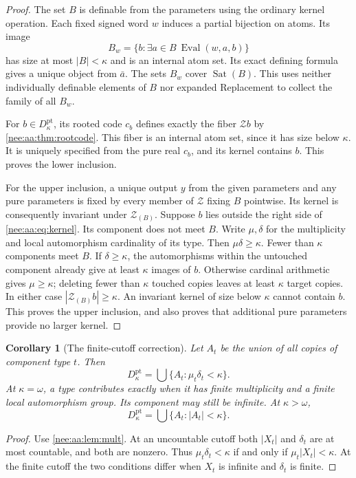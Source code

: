 \documentclass[11pt,letterpaper]{article}
\numberwithin{equation}{section}
\theoremstyle{plain}
\newtheorem{corollary}[corollary]{Corollary}
\theoremstyle{definition}
\theoremstyle{remark}
\newcommand{\Sat}{\operatorname{Sat}}
\newcommand{\Eval}{\operatorname{Eval}}
\newcommand{\srcs}[1]{\par\noindent{\footnotesize\textit{Sources:} #1}\par}
\begin{document}
\begin{proof}
The set $B$ is definable from the parameters using the ordinary kernel operation.
Each fixed signed word $w$ induces a partial bijection on atoms. Its image
\[
B_w=\{b:\exists a\in B\ \Eval(w,a,b)\}
\]
has size at most $|B|<\kappa$ and is an internal atom set. Its exact defining
formula gives a unique object from $\bar a$. The sets $B_w$ cover $\Sat(B)$.
This uses neither individually definable elements of $B$ nor expanded
Replacement to collect the family of all $B_w$.

For $b\in D^{\mathrm{pt}}_\kappa$, its rooted code $c_b$ defines exactly the
fiber $\mathcal Z b$ by \cref{nee:aa:thm:rootcode}. This fiber is an internal atom set,
since it has size below $\kappa$. It is uniquely specified from the pure real
$c_b$, and its kernel contains $b$. This proves the lower inclusion.

For the upper inclusion, a unique output $y$ from the given parameters and any
pure parameters is fixed by every member of $\mathcal Z$ fixing $B$ pointwise.
Its kernel is consequently invariant under $\mathcal Z_{(B)}$.
Suppose $b$ lies outside the right side of \eqref{nee:aa:eq:kernel}. Its component does
not meet $B$. Write $\mu,\delta$ for the multiplicity and local automorphism
cardinality of its type. Then $\mu\delta\geq\kappa$. Fewer than $\kappa$
components meet $B$. If $\delta\geq\kappa$, the automorphisms within the untouched
component already give at least $\kappa$ images of $b$. Otherwise cardinal
arithmetic gives $\mu\geq\kappa$; deleting fewer than $\kappa$ touched copies
leaves at least $\kappa$ target copies. In either case
$|\mathcal Z_{(B)}b|\geq\kappa$. An invariant kernel of size below $\kappa$ cannot
contain $b$. This proves the upper inclusion, and also proves that additional
pure parameters provide no larger kernel.
\end{proof}

\begin{corollary}[The finite-cutoff correction]\label{nee:aa:cor:finitekernel}
Let $A_t$ be the union of all copies of component type $t$. Then
\[
D^{\mathrm{pt}}_\kappa
=\bigcup\{A_t:\mu_t\delta_t<\kappa\}.
\]
At $\kappa=\omega$, a type contributes exactly when it has finite multiplicity
and a finite local automorphism group. Its component may still be infinite.
At $\kappa>\omega$,
\[
D^{\mathrm{pt}}_\kappa=\bigcup\{A_t:|A_t|<\kappa\}.
\]
\end{corollary}
\srcs{source~03, Corollary~4.2.}
\begin{proof}
Use \cref{nee:aa:lem:mult}. At an uncountable cutoff both $|X_t|$ and $\delta_t$ are at
most countable, and both are nonzero. Thus
$\mu_t\delta_t<\kappa$ if and only if $\mu_t|X_t|<\kappa$. At the finite
cutoff the two conditions differ when $X_t$ is infinite and $\delta_t$ is finite.
\end{proof}
\end{document}
